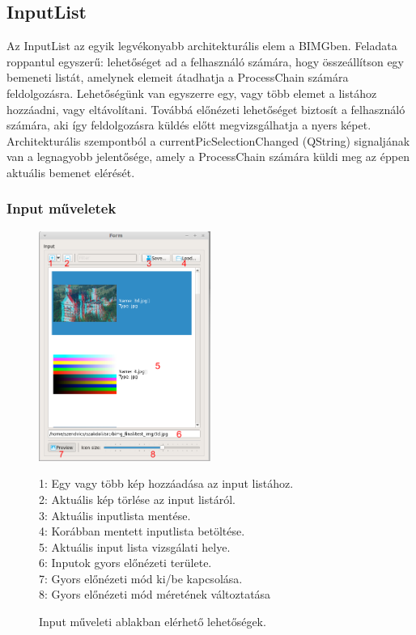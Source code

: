 \documentclass[a4paper,12pt,oneside]{report}
\begin{document}
\subsection{InputList}
Az InputList az egyik legvékonyabb architekturális elem a BIMGben. Feladata roppantul egyszerű: lehetőséget ad a felhasználó számára, hogy összeállítson egy bemeneti listát, amelynek elemeit átadhatja a ProcessChain számára feldolgozásra. Lehetőségünk van egyszerre egy, vagy több elemet a listához hozzáadni, vagy eltávolítani. Továbbá előnézeti lehetőséget biztosít a felhasználó számára, aki így feldolgozásra küldés előtt megvizsgálhatja a nyers képet. Architekturális szempontból a currentPicSelectionChanged (QString) signaljának van a legnagyobb jelentősége, amely a ProcessChain számára küldi meg az éppen aktuális bemenet elérését.

\subsubsection{Input műveletek}
\begin{center}
\begin{figure}[h]
  \includegraphics[width=0.5\textwidth]{user/fileeditor.png}
  \caption{Input műveleti ablakban elérhető lehetőségek.  }
1: Egy vagy több kép hozzáadása az input listához.\\2: Aktuális kép törlése az input listáról.\\3: Aktuális inputlista mentése.\\4: Korábban mentett inputlista betöltése.\\5: Aktuális input lista vizsgálati helye.\\6: Inputok gyors előnézeti területe.\\7: Gyors előnézeti mód ki/be kapcsolása.\\8: Gyors előnézeti mód méretének változtatása
  \label{fig:bimg_filelistdialog}
\end{figure}
\end{center}
\end{document}
